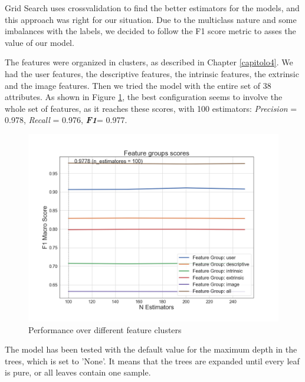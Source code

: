 Grid Search uses crossvalidation to find the better estimators for the models, and this approach was right for our situation.
Due to the multiclass nature and some imbalances with the labels, we decided to follow the F1 score metric to asses the value of our model.

The features were organized in clusters, as described in Chapter \ref{capitolo4}.
We had the user features, the descriptive features, the intrinsic features, the extrinsic and the image features. Then we tried the model with the entire set of 38 attributes.
As shown in Figure \ref{fig:feature_clusters}, the best configuration seems to involve the whole set of features, as it reaches these scores, with 100 estimators: \textit{Precision} = 0.978, \textit{Recall} = 0.976, \textbf{\textit{F1}}= 0.977.

\begin{figure}[htp!]
	\centering
	\includegraphics[width=\columnwidth]{chapter5/figure/feature_cluster_f1.png}
	\caption{Performance over different feature clusters}
	\label{fig:feature_clusters}
\end{figure}

The model has been tested with the default value for the maximum depth in the trees, which is set to 'None'. It means that the trees are expanded until every leaf is pure, or all leaves contain one sample.

